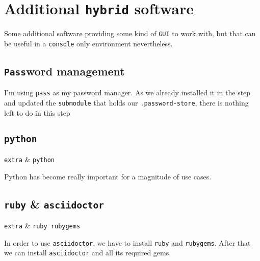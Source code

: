 \documentclass[10pt]{dustdoc}
\begin{document}
\section{Additional \texttt{hybrid} software}
\label{sec:additional-hybrid-software}

Some additional software providing some kind of \texttt{GUI} to work with, but that can be useful in a \texttt{console} only environment nevertheless.

\subsection{\texttt{Pass}word management}
\label{sec:password-management}

I’m using \texttt{pass} as my password manager.
As we already installed it in the  step and updated the \texttt{submodule} that holds our \texttt{.password-store}, there is nothing left to do in this step

\subsection{\texttt{python}}
\label{sec:python}

\begin{packagetable}
    \texttt{extra} & \texttt{python} \\
\end{packagetable}

Python has become really important for a magnitude of use cases.

\subsection{\texttt{ruby} \& \texttt{asciidoctor}}
\label{sec:ruby-and-asciidoctor}

\begin{packagetable}
    \texttt{extra} & \texttt{ruby rubygems} \\
\end{packagetable}

In order to use \texttt{asciidoctor}, we have to install \texttt{ruby} and \texttt{rubygems}.
After that we can install \texttt{asciidoctor} and all its required gems.
\end{document}

